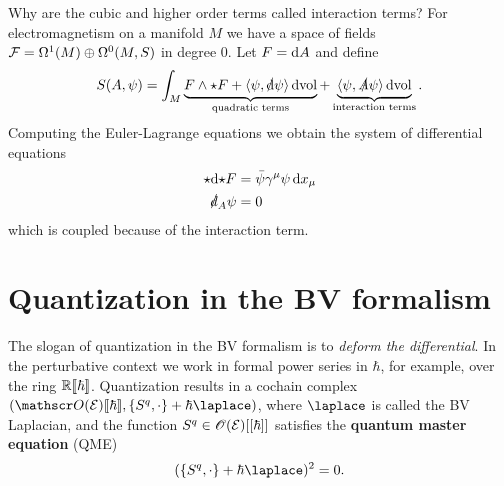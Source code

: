 \begin{example}
  Why are the cubic and higher order terms called interaction terms?
For electromagnetism on a manifold $M$ we have a space of fields
  $\mathcal{F} = \Omega^1(M) \oplus \Omega^0(M, S)$ in degree $0$. Let $F = \mathrm{d} A$ and define
  \begin{equation*}
    S(A, \psi) = \int_M
    \underbrace{F \wedge {\star} F
    + \langle \psi, \slashed{\mathrm{d}} \psi \rangle \, \mathrm{d} \mathrm{vol}}_{\text{quadratic terms}}
    + \underbrace{\langle \psi, \slashed{A} \psi \rangle \, \mathrm{d} \mathrm{vol}}_{\text{interaction terms}}.
  \end{equation*}
  Computing the Euler-Lagrange equations we obtain the system of differential equations
  \begin{align*}
    {\star} \mathrm{d} {\star} F &= \bar{\psi} \gamma^\mu \psi \, \mathrm{d} x_\mu \\
    \slashed{d}_A \psi &= 0
  \end{align*}
  which is coupled because of the interaction term.
\end{example}

\section{Quantization in the BV formalism}

The slogan of quantization in the BV formalism is to \textit{deform the differential}.
In the perturbative context we work in formal power series in $\hbar$, for example, over the ring $\mathbb{R} [\![ {\hbar} ]\!]$.
Quantization results in a cochain complex
$(\Oscr(\Ecal)\formalpow{\hbar}, \{S^q, \cdot\} + \hbar \laplace)$, where $\laplace$ is called the BV Laplacian, and the function
$S^q \in \mathscr{O}(\mathcal{E})[[\hbar]]$ satisfies the \textbf{quantum master equation} (QME)
\begin{equation*}
  (\{S^q, \cdot \} + \hbar \laplace)^2 = 0.
\end{equation*}

